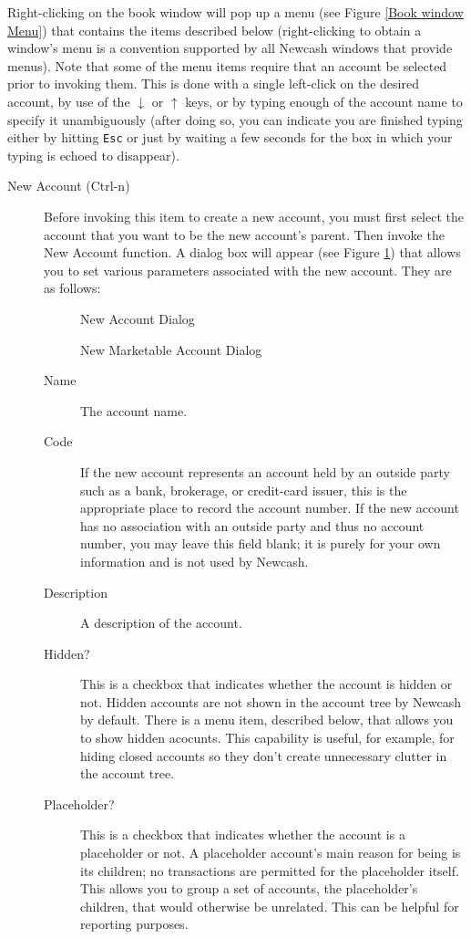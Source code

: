 \documentclass{report}
\newcommand{\graphicsfig}[5]{
\begin{figure}[#5]
\begin{center}
\resizebox{#1}{!}{\texttt{[image: \#2]}}
\end{center}
\caption{#3}
\label{#4}
\end{figure}
}
\begin{document}
Right-clicking on the book window will pop up a menu (see Figure \ref{Book window Menu}) that contains the items described below (right-clicking to obtain a window's menu is a convention supported by all Newcash windows that provide menus). Note that some of the menu items require that an account be selected prior to invoking them. This is done with a single left-click on the desired account, by use of the $\downarrow$ or $\uparrow$ keys, or by typing enough of the account name to specify it unambiguously (after doing so, you can indicate you are finished typing either by hitting \verb|Esc| or just by waiting a few seconds for the box in which your typing is echoed to disappear).
\begin{description}
\item [New Account (Ctrl-n)] Before invoking this item to create a new account, you must first select the account that you want to be the new account's parent. Then invoke the New Account function. A dialog box will appear (see Figure \ref{New Account Dialog}) that allows you to set various parameters associated with the new account. They are as follows:
\graphicsfig{5in}{figures/new_account_dialog.png}{New Account Dialog}{New Account Dialog}{}
\graphicsfig{5in}{figures/new_marketable_account_dialog.png}{New Marketable Account Dialog}{New Marketable Account Dialog}{}
\begin{description}
\item [Name] The account name.
\item [Code] If the new account represents an account held by an outside party such as a bank, brokerage, or credit-card issuer, this is the appropriate place to record the account number. If the new account has no association with an outside party and thus no account number, you may leave this field blank; it is purely for your own information and is not used by Newcash. 
\item [Description] A description of the account.
\item [Hidden?] This is a checkbox that indicates whether the account is hidden or not. Hidden accounts are not shown in the account tree by Newcash by default. There is a menu item, described below, that allows you to show hidden acocunts. This capability is useful, for example, for hiding closed accounts so they don't create unnecessary clutter in the account tree.
\item [Placeholder?] This is a checkbox that indicates whether the account is a placeholder or not. A placeholder account's main reason for being is its children; no transactions are permitted for the placeholder itself. This allows you to group a set of accounts, the placeholder's children, that would otherwise be unrelated. This can be helpful for reporting purposes.

\end{description}
\end{description}
\end{document}
